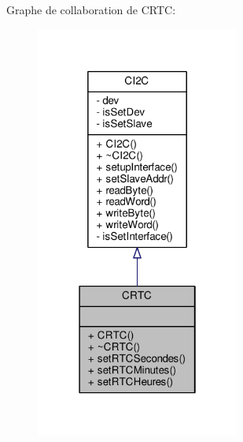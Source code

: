 Graphe de collaboration de C\+R\+T\+C\+:
\nopagebreak
\begin{figure}[H]
\begin{center}
\leavevmode
\includegraphics[width=190pt]{classCRTC__coll__graph}
\end{center}
\end{figure}
